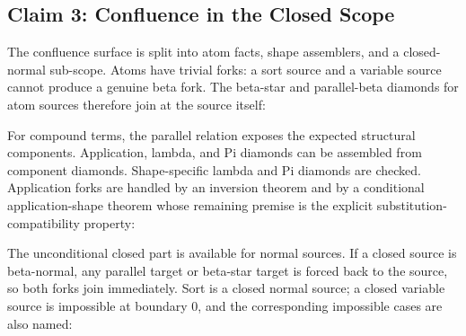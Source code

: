 \subsection{Claim 3: Confluence in the Closed Scope}
\label{subsec:claim-confluence-closed-scope}

The confluence surface is split into atom facts, shape assemblers, and a
closed-normal sub-scope.  Atoms have trivial forks: a sort source and a
variable source cannot produce a genuine beta fork.  The beta-star and
parallel-beta diamonds for atom sources therefore join at the source itself:


For compound terms, the parallel relation exposes the expected structural
components.  Application, lambda, and Pi diamonds can be assembled from
component diamonds.  Shape-specific lambda and Pi diamonds are checked.
Application forks are handled by an inversion theorem and by a conditional
application-shape theorem whose remaining premise is the explicit
substitution-compatibility property:


The unconditional closed part is available for normal sources.  If a closed
source is beta-normal, any parallel target or beta-star target is forced back
to the source, so both forks join immediately.  Sort is a closed normal
source; a closed variable source is impossible at boundary $0$, and the
corresponding impossible cases are also named:


